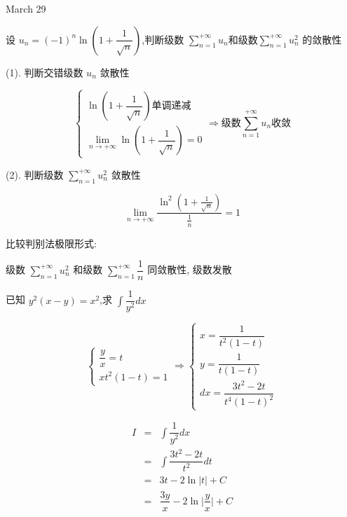 \textcolor{purplea}{March 29}

\begin{example}[][Exam: 29.4.14]
	设 $u_{n}=(-1)^{n}\ln(1+\dfrac{1}{\sqrt{n}})$,判断级数 $\sum\limits_{n=1}^{+\infty}u_{n}$和级数$\sum\limits_{n=1}^{+\infty}u^{2}_{n}$ 的敛散性
\end{example}

\begin{solution}
	
	(1). 判断交错级数 $u_{n}$ 敛散性
	
	$$\begin{cases}
		\ln(1+\dfrac{1}{\sqrt{n}})\text{单调递减}\\
		\lim\limits_{n \to +\infty}\ln(1+\dfrac{1}{\sqrt{n}})=0
	\end{cases}\Rightarrow
	\text{级数}\sum\limits_{n=1}^{+\infty}u_{n}\text{收敛}$$

	(2). 判断级数 $\sum\limits_{n=1}^{+\infty}u_{n}^{2}$ 敛散性
 
	$$\lim\limits_{n\to +\infty}\frac{\ln^{2}(1+\frac{1}{\sqrt{n}})}{\frac{1}{n}}=1$$
	
	比较判别法极限形式:

	级数 $\sum\limits_{n=1}^{+\infty}u^{2}_{n}$ 和级数 $\sum\limits_{n=1}^{+\infty}\dfrac{1}{n}$ 同敛散性, 级数发散 
\end{solution}

\begin{example}[][Exam: 29.4.15]
	已知 $y^{2}(x-y)=x^2$,求 $\int\dfrac{1}{y^2}dx$
\end{example}

\begin{solution}
	
	$$\begin{cases}
	  \dfrac{y}{x} = t \\
	  xt^{2}(1-t) = 1
	\end{cases}\Rightarrow 
	\begin{cases}
		x = \dfrac{1}{t^{2}(1-t)}\\
		y = \dfrac{1}{t(1-t)}\\
		dx = \dfrac{3t^{2}-2t}{t^{4}(1-t)^{2}}
	\end{cases}$$
	
	\begin{eqnarray*}
		I & = & \int \dfrac{1}{y^{2}}dx\\
		  & = & \int \dfrac{3t^{2}-2t}{t^{2}}dt\\
		  & = & 3t -2\ln |t| + C\\
		  & = & \dfrac{3y}{x} -2\ln \big|\dfrac{y}{x}\big| + C
	\end{eqnarray*}
\end{solution}


